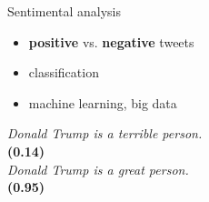 \documentclass{beamer}
\begin{document}
\begin{frame}[fragile]
\begin{columns}[T]
\begin{column}{.33\textwidth}
\begin{block}{Sentimental analysis}
\begin{itemize}
    \item \textbf{positive} vs. \textbf{negative} tweets
    \item classification
    \item machine learning, big data
\end{itemize}
\center
\textit{Donald Trump is a terrible person.}\\
\textbf{(0.14)}\\
\vspace{0.5cm}
\textit{Donald Trump is a great person.}\\
\textbf{(0.95)}
\end{block}























\end{column}
\begin{column}{.3\textwidth}

\end{column}
\begin{column}{.33\textwidth}

\end{column}
\end{columns}

\end{frame}
\end{document}
